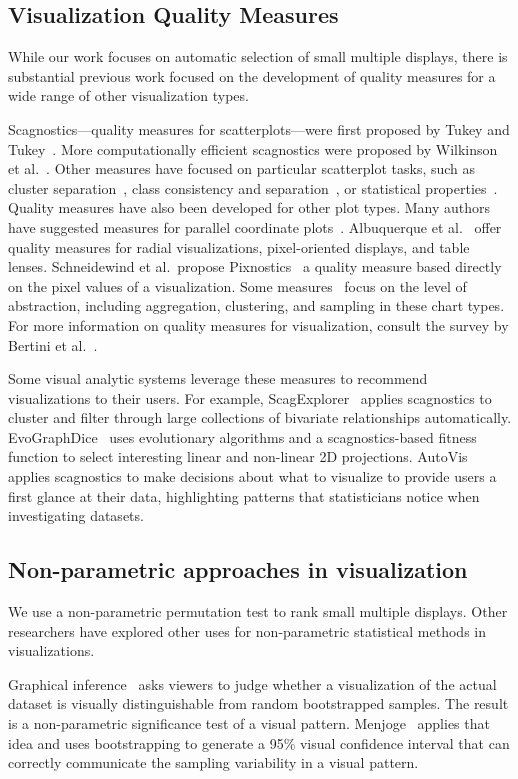 \subsection{Visualization Quality Measures}
While our work focuses on automatic selection of small multiple displays, there is substantial previous work focused on the development of quality measures for a wide range of other visualization types. 

Scagnostics---quality measures for scatterplots---were first proposed by Tukey and Tukey~\cite{Tukey1982, Tukey1985}. More computationally efficient scagnostics were proposed by Wilkinson et al.~\cite{Wilkinson2005, Wilkinson2008}. Other measures have focused on particular scatterplot tasks, such as cluster separation~\cite{Sedlmair2012, Tatu2009}, class consistency and separation~\cite{Sips2009, Schafer2013}, or statistical properties~\cite{Kandel2012, Seo2005, Piringer2008}.
Quality measures have also been developed for other plot types. Many authors have suggested measures for parallel coordinate plots~\cite{Ankerst1998, Dasgupta2010, Johansson2009, Yang2003}. Albuquerque et al.~\cite{Albuquerque2010} offer quality measures for radial visualizations, pixel-oriented displays, and table lenses. Schneidewind et al.\ propose Pixnostics~\cite{Schneidewind2006} a quality measure based directly on the pixel values of a visualization. Some measures~\cite{Bertini2006, Cui2006, Yang2003} focus on the level of abstraction, including aggregation, clustering, and sampling in these chart types. For more information on quality measures for visualization, consult the survey by Bertini et al.~\cite{Bertini2011}. 

Some visual analytic systems leverage these measures to recommend visualizations to their users. For example, ScagExplorer~\cite{Dang2014} applies scagnostics to cluster and filter through large collections of bivariate relationships automatically.
EvoGraphDice~\cite{Boukhelifa2013} uses evolutionary algorithms and a scagnostics-based fitness function to select interesting linear and non-linear 2D projections.
AutoVis~\cite{Wills2010} applies scagnostics to make decisions about what to visualize to provide users a first glance at their data, highlighting patterns that statisticians notice when investigating datasets.

\subsection{Non-parametric approaches in visualization}
We use a non-parametric permutation test to rank small multiple displays. Other researchers have explored other uses for non-parametric statistical methods in visualizations.

Graphical inference~\cite{Buja2009, Wickham2013, Majumder2013} asks viewers to judge whether a visualization of the actual dataset is visually distinguishable from random bootstrapped samples. The result is a non-parametric significance test of a visual pattern. Menjoge~\cite{Menjoge2010} applies that idea and uses bootstrapping to generate a 95\% visual confidence interval that can correctly communicate the sampling variability in a visual pattern. 

